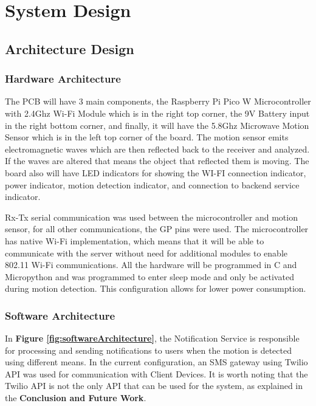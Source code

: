 \section{System Design}\label{sec:system-design}

\subsection{Architecture Design}\label{subsec:architecture-design}

\subsubsection{Hardware Architecture}



The PCB will have 3 main components, the Raspberry Pi Pico W Microcontroller with
2.4Ghz Wi-Fi Module which is in the right top corner, the 9V Battery input in the
right bottom corner, and finally, it will have the 5.8Ghz Microwave Motion Sensor
which is in the left top corner of the board. The motion sensor emits electromagnetic waves
which are then reflected back to the receiver and analyzed. If the waves are altered that
means the object that reflected them is moving. The board also will have LED indicators for
showing the WI-FI connection indicator, power indicator, motion detection indicator, and
connection to backend service indicator.

Rx-Tx serial communication was used between the
microcontroller and motion sensor, for all other communications, the GP pins were used. The microcontroller has native Wi-Fi implementation, which means that it will be able to communicate with the server without need for additional modules to enable 802.11 Wi-Fi communications. All the hardware will be programmed in C and Micropython and was programmed to enter sleep mode and only be activated during motion detection. This configuration allows for lower power consumption.

\subsubsection{Software Architecture}

In \textbf{Figure \ref{fig:softwareArchitecture}}, the Notification Service is responsible for
processing and sending notifications to users when the motion is detected using different
means. In the current configuration, an SMS gateway using Twilio API was used for
communication with Client Devices. It is worth noting that the Twilio API is not the only API
that can be used for the system, as explained in the \textbf{Conclusion and Future Work}.

